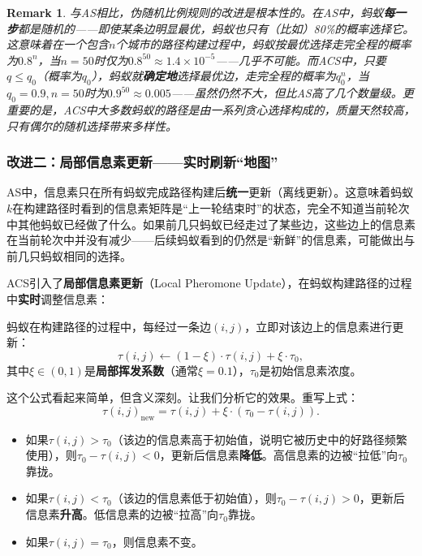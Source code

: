 \documentclass[lang=cn,zihao=-4,a4paper,fontset=windows]{beautybook}
\newtheorem*{remark}{\textbf{Remark}}
\begin{document}
\begin{remark}
与AS相比，伪随机比例规则的改进是根本性的。在AS中，蚂蚁\textbf{每一步}都是随机的——即使某条边明显最优，蚂蚁也只有（比如）80\%的概率选择它。这意味着在一个包含$n$个城市的路径构建过程中，蚂蚁按最优选择走完全程的概率为$0.8^n$，当$n=50$时仅为$0.8^{50} \approx 1.4 \times 10^{-5}$——几乎不可能。而ACS中，只要$q \leq q_0$（概率为$q_0$），蚂蚁就\textbf{确定地}选择最优边，走完全程的概率为$q_0^n$，当$q_0=0.9, n=50$时为$0.9^{50} \approx 0.005$——虽然仍然不大，但比AS高了几个数量级。更重要的是，ACS中大多数蚂蚁的路径是由一系列贪心选择构成的，质量天然较高，只有偶尔的随机选择带来多样性。
\end{remark}

\subsubsection{改进二：局部信息素更新——实时刷新“地图”}

AS中，信息素只在所有蚂蚁完成路径构建后\textbf{统一}更新（离线更新）。这意味着蚂蚁$k$在构建路径时看到的信息素矩阵是“上一轮结束时”的状态，完全不知道当前轮次中其他蚂蚁已经做了什么。如果前几只蚂蚁已经走过了某些边，这些边上的信息素在当前轮次中并没有减少——后续蚂蚁看到的仍然是“新鲜”的信息素，可能做出与前几只蚂蚁相同的选择。

ACS引入了\textbf{局部信息素更新}（Local Pheromone Update），在蚂蚁构建路径的过程中\textbf{实时}调整信息素：

\begin{definition}[][局部信息素更新]
蚂蚁在构建路径的过程中，每经过一条边$(i,j)$，立即对该边上的信息素进行更新：
\[
\tau(i,j) \leftarrow (1 - \xi) \cdot \tau(i,j) + \xi \cdot \tau_0,
\]
其中$\xi \in (0,1)$是\textbf{局部挥发系数}（通常$\xi = 0.1$），$\tau_0$是初始信息素浓度。
\end{definition}

这个公式看起来简单，但含义深刻。让我们分析它的效果。重写上式：
\[
\tau(i,j)_{\text{new}} = \tau(i,j) + \xi \cdot (\tau_0 - \tau(i,j)).
\]

\begin{itemize}
    \item 如果$\tau(i,j) > \tau_0$（该边的信息素高于初始值，说明它被历史中的好路径频繁使用），则$\tau_0 - \tau(i,j) < 0$，更新后信息素\textbf{降低}。高信息素的边被“拉低”向$\tau_0$靠拢。
    \item 如果$\tau(i,j) < \tau_0$（该边的信息素低于初始值），则$\tau_0 - \tau(i,j) > 0$，更新后信息素\textbf{升高}。低信息素的边被“拉高”向$\tau_0$靠拢。
    \item 如果$\tau(i,j) = \tau_0$，则信息素不变。
\end{itemize}
\end{document}
